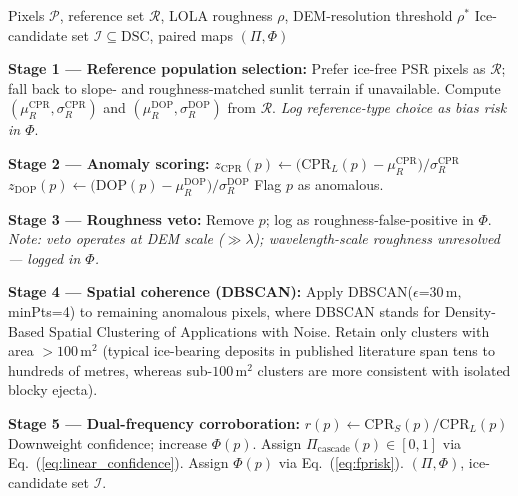 \documentclass[10pt,conference]{IEEEtran}
\newcommand{\CPR}{\mathrm{CPR}}
\newcommand{\DOP}{\mathrm{DOP}}
\newcommand{\DSC}{\mathrm{DSC}}
\begin{document}
\begin{algorithm}[h]
\caption{Five-Stage AND-Cascade Ice Detector}
\label{alg:detect}
\begin{algorithmic}[1]
\REQUIRE Pixels $\mathcal{P}$, reference set $\mathcal{R}$,
         LOLA roughness $\rho$, DEM-resolution threshold $\rho^*$
\ENSURE Ice-candidate set $\mathcal{I} \subseteq \DSC$,
        paired maps $(\Pi, \Phi)$

\STATE \textbf{Stage 1 — Reference population selection:}
\STATE \quad Prefer ice-free PSR pixels as $\mathcal{R}$; fall back to
         slope- and roughness-matched sunlit terrain if unavailable.
\STATE \quad Compute $(\mu_R^{\CPR}, \sigma_R^{\CPR})$ and
         $(\mu_R^{\DOP}, \sigma_R^{\DOP})$ from $\mathcal{R}$.
\STATE \quad \textit{Log reference-type choice as bias risk in $\Phi$}.

\STATE \textbf{Stage 2 — Anomaly scoring:}
\FOR{each $p \in \DSC$}
  \STATE $z_{\CPR}(p) \leftarrow
    \bigl(\CPR_L(p) - \mu_R^{\CPR}\bigr) / \sigma_R^{\CPR}$
  \STATE $z_{\DOP}(p) \leftarrow
    \bigl(\DOP(p) - \mu_R^{\DOP}\bigr) / \sigma_R^{\DOP}$
  \IF{$z_{\CPR}(p) \ge 2$ \AND $z_{\DOP}(p) \le -2$}
    \STATE Flag $p$ as anomalous.
  \ENDIF
\ENDFOR

\STATE \textbf{Stage 3 — Roughness veto:}
    \STATE Remove $p$; log as roughness-false-positive in $\Phi$.
  \ENDIF
\ENDFOR
\STATE \quad \textit{Note: veto operates at DEM scale ($\gg\lambda$);
              wavelength-scale roughness unresolved --- logged in $\Phi$.}

\STATE \textbf{Stage 4 — Spatial coherence (DBSCAN):}
\STATE Apply DBSCAN($\epsilon$=30\,m, minPts=4) to remaining anomalous
       pixels, where DBSCAN stands for Density-Based Spatial Clustering of Applications with Noise.
\STATE Retain only clusters with area $> 100$\,m$^2$ (typical ice-bearing
       deposits in published literature span tens to hundreds of metres,
       whereas sub-$100$\,m$^2$ clusters are more consistent with isolated
       blocky ejecta).

\STATE \textbf{Stage 5 — Dual-frequency corroboration:}
  \STATE $r(p) \leftarrow \CPR_S(p) / \CPR_L(p)$
    \STATE Downweight confidence; increase $\Phi(p)$.
  \ENDIF
\ENDFOR
\STATE Assign $\Pi_{\mathrm{cascade}}(p) \in [0,1]$ via Eq.~(\ref{eq:linear_confidence}).
\STATE Assign $\Phi(p)$ via Eq.~(\ref{eq:fprisk}).
\RETURN $(\Pi, \Phi)$, ice-candidate set $\mathcal{I}$.
\end{algorithmic}
\end{algorithm}
\end{document}
